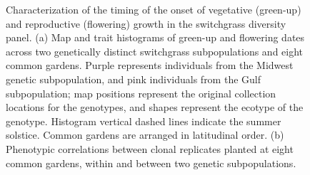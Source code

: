 \documentclass[
  9pt,
  twocolumn,
  twoside]{pnas-new}
\begin{document}
\begin{figure}


\caption{\label{fig-map}Characterization of the timing of the onset of
vegetative (green-up) and reproductive (flowering) growth in the
switchgrass diversity panel. (a) Map and trait histograms of green-up
and flowering dates across two genetically distinct switchgrass
subpopulations and eight common gardens. Purple represents individuals
from the Midwest genetic subpopulation, and pink individuals from the
Gulf subpopulation; map positions represent the original collection
locations for the genotypes, and shapes represent the ecotype of the
genotype. Histogram vertical dashed lines indicate the summer solstice.
Common gardens are arranged in latitudinal order. (b) Phenotypic
correlations between clonal replicates planted at eight common gardens,
within and between two genetic subpopulations.}

\end{figure}%
\end{document}
